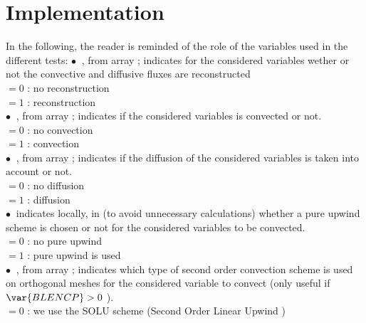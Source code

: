 \section*{Implementation}

In the following, the reader is reminded of the role of the variables used in the different tests:
$\bullet \ $ , from array  ; indicates for the considered variables wether 
or not the convective and diffusive fluxes are reconstructed \\ 
\hspace*{1cm}$ = 0$ : no reconstruction\\
\hspace*{1cm}$ = 1$ : reconstruction\\
$\bullet \ $ , from array  ; indicates if the considered variables is convected or not.\\
\hspace*{1cm}$ = 0$ : no convection\\
\hspace*{1cm}$ = 1$ : convection\\
$\bullet \ $ , from array  ; indicates if the diffusion of the considered variables is 
taken into account or not.\\
\hspace*{1cm}$ = 0$ : no diffusion\\
\hspace*{1cm}$ = 1$ : diffusion\\
 $\bullet \ $  indicates locally, in  (to avoid unnecessary calculations) whether a pure upwind scheme is chosen  or not for the considered variables to be convected. \\
\hspace*{1cm}$ = 0$ : no pure upwind\\
\hspace*{1cm}$ = 1$ : pure upwind is used\\
$\bullet \ $ , from array  ; indicates which type of second order convection scheme is used on orthogonal meshes for the considered variable to convect  (only useful if $\var{BLENCP}>0\ $).\\ 
\hspace*{1cm}$ = 0$ : we use the  SOLU scheme (Second Order Linear
Upwind ) \\
